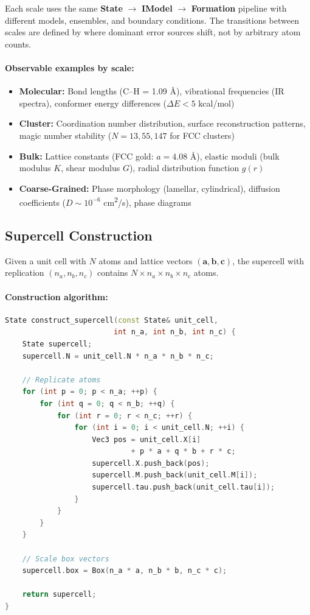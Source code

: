 \documentclass[11pt]{article}
\begin{document}
Each scale uses the same \textbf{State} $\to$ \textbf{IModel} $\to$ \textbf{Formation} pipeline with different models, ensembles, and boundary conditions. The transitions between scales are defined by where dominant error sources shift, not by arbitrary atom counts.

\paragraph{Observable examples by scale:}

\begin{itemize}
\item \textbf{Molecular:} Bond lengths (C--H = 1.09 \AA), vibrational frequencies (IR spectra), conformer energy differences ($\Delta E < 5$ kcal/mol)
\item \textbf{Cluster:} Coordination number distribution, surface reconstruction patterns, magic number stability ($N = 13, 55, 147$ for FCC clusters)
\item \textbf{Bulk:} Lattice constants (FCC gold: $a = 4.08$ \AA), elastic moduli (bulk modulus $K$, shear modulus $G$), radial distribution function $g(r)$
\item \textbf{Coarse-Grained:} Phase morphology (lamellar, cylindrical), diffusion coefficients ($D \sim 10^{-6}$ cm\textsuperscript{2}/s), phase diagrams
\end{itemize}

\subsection{Supercell Construction}

Given a unit cell with $N$ atoms and lattice vectors $(\mathbf{a}, \mathbf{b}, \mathbf{c})$, the supercell with replication $(n_a, n_b, n_c)$ contains $N \times n_a \times n_b \times n_c$ atoms.

\paragraph{Construction algorithm:}

\begin{lstlisting}[language=C++]
State construct_supercell(const State& unit_cell,
                         int n_a, int n_b, int n_c) {
    State supercell;
    supercell.N = unit_cell.N * n_a * n_b * n_c;
    
    // Replicate atoms
    for (int p = 0; p < n_a; ++p) {
        for (int q = 0; q < n_b; ++q) {
            for (int r = 0; r < n_c; ++r) {
                for (int i = 0; i < unit_cell.N; ++i) {
                    Vec3 pos = unit_cell.X[i] 
                             + p * a + q * b + r * c;
                    supercell.X.push_back(pos);
                    supercell.M.push_back(unit_cell.M[i]);
                    supercell.tau.push_back(unit_cell.tau[i]);
                }
            }
        }
    }
    
    // Scale box vectors
    supercell.box = Box(n_a * a, n_b * b, n_c * c);
    
    return supercell;
}
\end{lstlisting}
\end{document}
